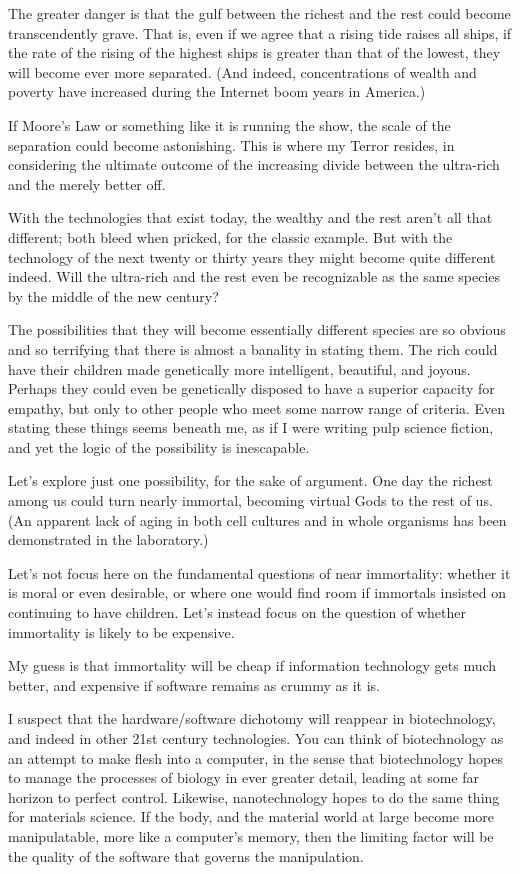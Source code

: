 \documentclass[letterpaper,12pt,english]{sphinxmanual}
\begin{document}
The greater danger is that the gulf between the richest and the rest could become transcendently grave. That is, even if we agree that a rising tide raises all ships, if the rate of the rising of the highest ships is greater than that of the lowest, they will become ever more separated. (And indeed, concentrations of wealth and poverty have increased during the Internet boom years in America.)

If Moore's Law or something like it is running the show, the scale of the separation could become astonishing. This is where my Terror resides, in considering the ultimate outcome of the increasing divide between the ultra-rich and the merely better off.

With the technologies that exist today, the wealthy and the rest aren't all that different; both bleed when pricked, for the classic example. But with the technology of the next twenty or thirty years they might become quite different indeed. Will the ultra-rich and the rest even be recognizable as the same species by the middle of the new century?

The possibilities that they will become essentially different species are so obvious and so terrifying that there is almost a banality in stating them. The rich could have their children made genetically more intelligent, beautiful, and joyous. Perhaps they could even be genetically disposed to have a superior capacity for empathy, but only to other people who meet some narrow range of criteria. Even stating these things seems beneath me, as if I were writing pulp science fiction, and yet the logic of the possibility is inescapable.

Let's explore just one possibility, for the sake of argument. One day the richest among us could turn nearly immortal, becoming virtual Gods to the rest of us. (An apparent lack of aging in both cell cultures and in whole organisms has been demonstrated in the laboratory.)

Let's not focus here on the fundamental questions of near immortality: whether it is moral or even desirable, or where one would find room if immortals insisted on continuing to have children. Let's instead focus on the question of whether immortality is likely to be expensive.

My guess is that immortality will be cheap if information technology gets much better, and expensive if software remains as crummy as it is.

I suspect that the hardware/software dichotomy will reappear in biotechnology, and indeed in other 21st century technologies. You can think of biotechnology as an attempt to make flesh into a computer, in the sense that biotechnology hopes to manage the processes of biology in ever greater detail, leading at some far horizon to perfect control. Likewise, nanotechnology hopes to do the same thing for materials science. If the body, and the material world at large become more manipulatable, more like a computer's memory, then the limiting factor will be the quality of the software that governs the manipulation.
\end{document}
